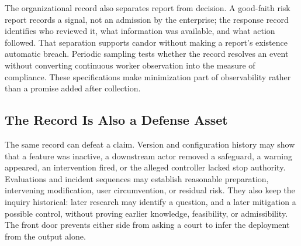 The organizational record also separates report from decision. A good-faith risk report records a signal, not an admission by the enterprise; the response record identifies who reviewed it, what information was available, and what action followed. That separation supports candor without making a report's existence automatic breach. Periodic sampling tests whether the record resolves an event without converting continuous worker observation into the measure of compliance. These specifications make minimization part of observability rather than a promise added after collection.

\subsection{The Record Is Also a Defense Asset}

The same record can defeat a claim. Version and configuration history may show that a feature was inactive, a downstream actor removed a safeguard, a warning appeared, an intervention fired, or the alleged controller lacked stop authority. Evaluations and incident sequences may establish reasonable preparation, intervening modification, user circumvention, or residual risk. They also keep the inquiry historical: later research may identify a question, and a later mitigation a possible control, without proving earlier knowledge, feasibility, or admissibility. The front door prevents either side from asking a court to infer the deployment from the output alone.
